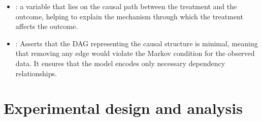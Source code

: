 \documentclass[letterpaper,10pt,english]{jupyterBook}
\begin{document}
\begin{itemize}
\item {} 
\sphinxAtStartPar
{}: a variable that lies on the causal path between the treatment and the outcome, helping to explain the mechanism through which the treatment affects the outcome.

\item {} 
\sphinxAtStartPar
{}: Asserts that the DAG representing the causal structure is minimal, meaning that removing any edge would violate the Markov condition for the observed data. It ensures that the model encodes only necessary dependency relationships.

\end{itemize}


\section{Experimental design and analysis}
\end{document}
